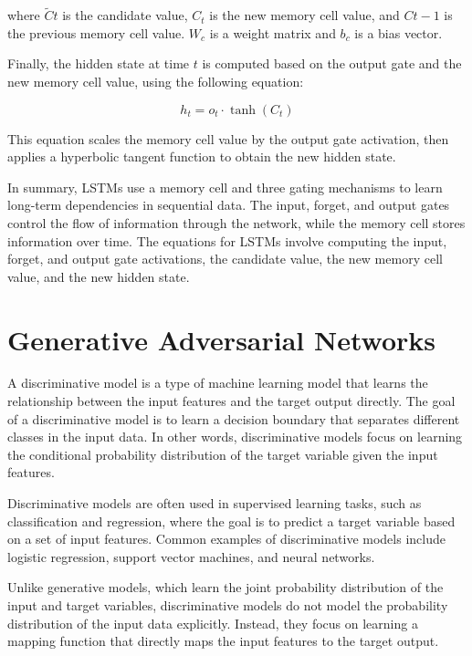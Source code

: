 where $\tilde{C}t$ is the candidate value, $C_t$ is the new memory cell value, and $C{t-1}$ is the previous memory cell value. $W_c$ is a weight matrix and $b_c$ is a bias vector.

Finally, the hidden state at time $t$ is computed based on the output gate and the new memory cell value, using the following equation:

\begin{equation}
	h_t = o_t \cdot \tanh(C_t)
\end{equation}

This equation scales the memory cell value by the output gate activation, then applies a hyperbolic tangent function to obtain the new hidden state.

In summary, LSTMs use a memory cell and three gating mechanisms to learn long-term dependencies in sequential data. The input, forget, and output gates control the flow of information through the network, while the memory cell stores information over time. The equations for LSTMs involve computing the input, forget, and output gate activations, the candidate value, the new memory cell value, and the new hidden state.

\section{Generative Adversarial Networks}
\label{sec:3_gans}

A discriminative model is a type of machine learning model that learns the relationship between the input features and the target output directly. The goal of a discriminative model is to learn a decision boundary that separates different classes in the input data. In other words, discriminative models focus on learning the conditional probability distribution of the target variable given the input features.

Discriminative models are often used in supervised learning tasks, such as classification and regression, where the goal is to predict a target variable based on a set of input features. Common examples of discriminative models include logistic regression, support vector machines, and neural networks.

Unlike generative models, which learn the joint probability distribution of the input and target variables, discriminative models do not model the probability distribution of the input data explicitly. Instead, they focus on learning a mapping function that directly maps the input features to the target output.


